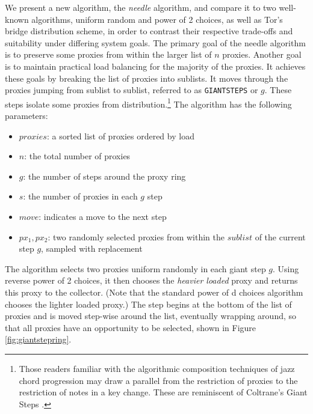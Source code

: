 We present a new algorithm, the \emph{needle} algorithm, and compare it to two well-known algorithms, uniform random and power of 2 choices, as well as Tor's bridge distribution scheme, in order to contrast their respective trade-offs and suitability under differing system goals. The primary goal of the needle algorithm is to preserve some proxies from within the larger list of $n$ proxies. Another goal is to maintain practical load balancing for the majority of the proxies. It achieves these goals by breaking the list of proxies into sublists. It moves through the proxies jumping from sublist to sublist, referred to as \texttt{GIANTSTEPS} or $g$. These steps isolate some proxies from distribution.\footnote{Those readers familiar with the algorithmic composition techniques of jazz chord progression may draw a parallel from the restriction of proxies to the restriction of notes in a key change. These are reminiscent of Coltrane's Giant Steps \cite{lateef1981repository}.} The algorithm has the following parameters:
    \begin{itemize}
        \item $proxies$: a sorted list of proxies ordered by load
        \item $n$: the total number of proxies
        \item $g$: the number of steps around the proxy ring
        \item $s$: the number of proxies in each $g$ step
        \item $move$: indicates a move to the next step 
        \item $px_1, px_2$: two randomly selected proxies from within the $sublist$ of the current step $g$, sampled with replacement
    \end{itemize}

The algorithm selects two proxies uniform randomly in each giant step $g$. Using reverse power of 2 choices, it then chooses the \textit{heavier loaded} proxy and returns this proxy to the collector. (Note that the standard power of d choices algorithm chooses the lighter loaded proxy.) The step begins at the bottom of the list of proxies and is moved step-wise around the list, eventually wrapping around, so that all proxies have an opportunity to be selected, shown in Figure \ref{fig:giantstepring}.

